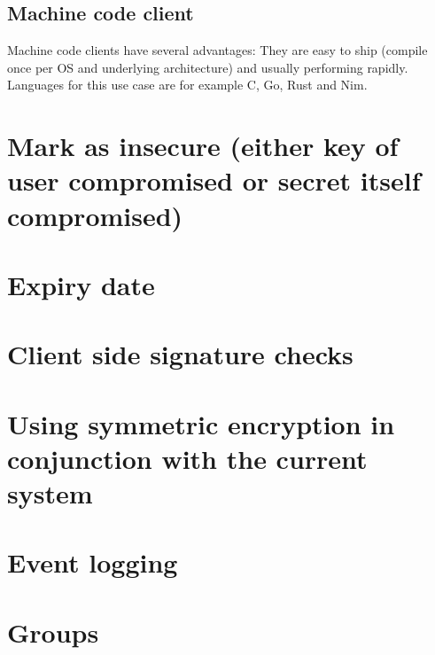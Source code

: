 \subsection{Machine code client}

Machine code clients have several advantages: They are easy to ship (compile
once per OS and underlying architecture) and usually performing rapidly.
Languages for this use case are for example C, Go, Rust and Nim.


\section{Mark as insecure (either key of user compromised or secret itself compromised)}
\section{Expiry date}
\section{Client side signature checks}
\section{Using symmetric encryption in conjunction with the current system}
\section{Event logging}
\section{Groups}
